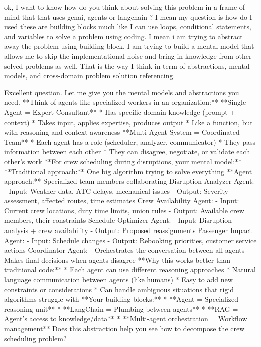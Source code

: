 \begin{userprompt}
ok, I want to know how do you think about solving this problem in a frame of mind that that uses genai, agents or langchain ?
I mean my question is how do I used these are building blocks much like I can use loops, conditional statements, and variables to solve a problem using coding.
I mean i am trying to abstract away the problem using building block, I am trying to build a mental model that allows me to skip the implementational noise and bring in knowledge from other solved problems as well. That is the way I think in term of abstractions, mental models, and cross-domain problem solution referencing.
\end{userprompt}

\begin{botresponse}
Excellent question. Let me give you the mental models and abstractions you need.
**Think of agents like specialized workers in an organization:**
**Single Agent = Expert Consultant**
*   Has specific domain knowledge (prompt + context)
*   Takes input, applies expertise, produces output
*   Like a function, but with reasoning and context-awareness
**Multi-Agent System = Coordinated Team**
*   Each agent has a role (scheduler, analyzer, communicator)
*   They pass information between each other
*   They can disagree, negotiate, or validate each other's work
**For crew scheduling during disruptions, your mental model:**
**Traditional approach:** One big algorithm trying to solve everything **Agent approach:** Specialized team members collaborating
    Disruption Analyzer Agent:
    - Input: Weather data, ATC delays, mechanical issues
    - Output: Severity assessment, affected routes, time estimates
    Crew Availability Agent:
    - Input: Current crew locations, duty time limits, union rules
    - Output: Available crew members, their constraints
    Schedule Optimizer Agent:
    - Input: Disruption analysis + crew availability
    - Output: Proposed reassignments
    Passenger Impact Agent:
    - Input: Schedule changes
    - Output: Rebooking priorities, customer service actions
    Coordinator Agent:
    - Orchestrates the conversation between all agents
    - Makes final decisions when agents disagree
**Why this works better than traditional code:**
*   Each agent can use different reasoning approaches
*   Natural language communication between agents (like humans)
*   Easy to add new constraints or considerations
*   Can handle ambiguous situations that rigid algorithms struggle with
**Your building blocks:**
*   **Agent = Specialized reasoning unit**
*   **LangChain = Plumbing between agents**
*   **RAG = Agent's access to knowledge/data**
*   **Multi-agent orchestration = Workflow management**
Does this abstraction help you see how to decompose the crew scheduling problem?
\end{botresponse}

